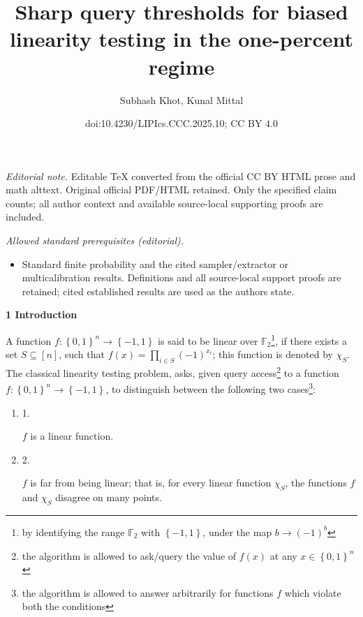 \documentclass[10pt,a4paper]{article}
\title{Sharp query thresholds for biased linearity testing in the one-percent regime}
\author{Subhash Khot, Kunal Mittal}
\date{doi:10.4230/LIPIcs.CCC.2025.10; CC BY 4.0}
\begin{document}
\maketitle
\noindent\textit{Editorial note.} Editable TeX converted from the official CC BY HTML prose and math alttext. Original official PDF/HTML retained. Only the specified claim counts; all author context and available source-local supporting proofs are included.\par\medskip
\noindent\textit{Allowed standard prerequisites (editorial).}\begin{itemize}
\item Standard finite probability and the cited sampler/extractor or multicalibration results. Definitions and all source-local support proofs are retained; cited established results are used as the authors state.
\end{itemize}\medskip


\par\medskip\noindent\textbf{
1 Introduction}\par




A function $f:\left\{0,1\right\}^{n}\to\left\{-1,1\right\}$ is said to be linear over $\mathbb{F}_{2}$\footnote{by identifying the range $\mathbb{F}_{2}$ with $\left\{-1,1\right\}$, under the map $b\to(-1)^{b}$}, if there exists a set $S\subseteq[n]$, such that $f(x)=\prod_{i\in S}\left(-1\right)^{x_{i}}$; this function is denoted by $\chi_{S}$.
The classical linearity testing problem, asks, given query access\footnote{the algorithm is allowed to ask/query the value of $f(x)$ at any $x\in\left\{0,1\right\}^{n}$} to a function $f:\left\{0,1\right\}^{n}\to\left\{-1,1\right\}$, to distinguish between the following two cases\footnote{the algorithm is allowed to answer arbitrarily for functions $f$ which violate both the conditions}:\par


\begin{enumerate}


\item[] 
1. 


$f$ is a linear function.\par





\item[] 
2. 


$f$ is far from being linear; that is, for every linear function $\chi_{S}$, the functions $f$ and $\chi_{S}$ disagree on many points.\par





\end{enumerate}
\end{document}
